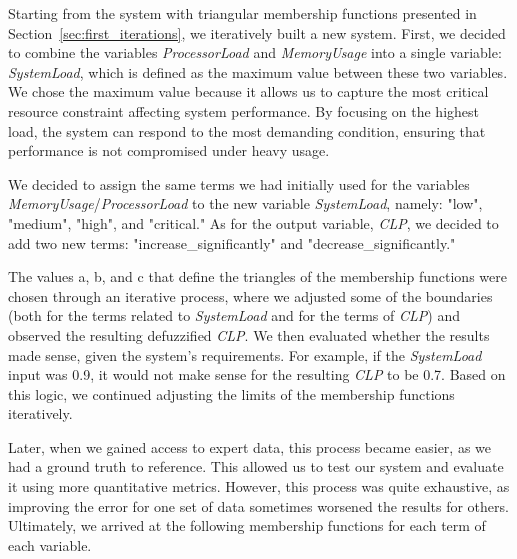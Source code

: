 \documentclass[titlepage]{article}
\begin{document}
Starting from the system with triangular membership functions presented in Section~\ref{sec:first_iterations}, we iteratively built a new system. First, we decided to combine the variables \textit{ProcessorLoad} and \textit{MemoryUsage} into a single variable: \textit{SystemLoad}, which is defined as the maximum value between these two variables. We chose the maximum value because it allows us to capture the most critical resource constraint affecting system performance. By focusing on the highest load, the system can respond to the most demanding condition, ensuring that performance is not compromised under heavy usage.


We decided to assign the same terms we had initially used for the variables \textit{MemoryUsage}/\textit{ProcessorLoad} to the new variable \textit{SystemLoad}, namely: "low", "medium", "high", and "critical." As for the output variable, \textit{CLP}, we decided to add two new terms: "increase\_significantly" and "decrease\_significantly."

The values a, b, and c that define the triangles of the membership functions were chosen through an iterative process, where we adjusted some of the boundaries (both for the terms related to \textit{SystemLoad} and for the terms of \textit{CLP}) and observed the resulting defuzzified \textit{CLP}. We then evaluated whether the results made sense, given the system's requirements. For example, if the \textit{SystemLoad} input was 0.9, it would not make sense for the resulting \textit{CLP} to be 0.7. Based on this logic, we continued adjusting the limits of the membership functions iteratively.

Later, when we gained access to expert data, this process became easier, as we had a ground truth to reference. This allowed us to test our system and evaluate it using more quantitative metrics. However, this process was quite exhaustive, as improving the error for one set of data sometimes worsened the results for others. Ultimately, we arrived at the following membership functions for each term of each variable.
\end{document}
